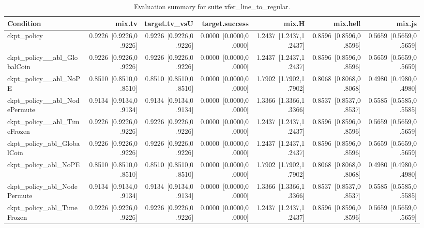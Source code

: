\begin{table}[t]
\centering
\caption{Evaluation summary for suite xfer_line_to_regular.}
\label{tab:eval_xfer_line_to_regular}
\begin{tabular}{lrrrrrr}
\toprule
Condition & mix.tv & target.tv\_vsU & target.success & mix.H & mix.hell & mix.js \\
\midrule
ckpt\_policy & 0.9226~[0.9226,0.9226] & 0.9226~[0.9226,0.9226] & 0.0000~[0.0000,0.0000] & 1.2437~[1.2437,1.2437] & 0.8596~[0.8596,0.8596] & 0.5659~[0.5659,0.5659] \\
ckpt\_policy\_\_abl\_GlobalCoin & 0.9226~[0.9226,0.9226] & 0.9226~[0.9226,0.9226] & 0.0000~[0.0000,0.0000] & 1.2437~[1.2437,1.2437] & 0.8596~[0.8596,0.8596] & 0.5659~[0.5659,0.5659] \\
ckpt\_policy\_\_abl\_NoPE & 0.8510~[0.8510,0.8510] & 0.8510~[0.8510,0.8510] & 0.0000~[0.0000,0.0000] & 1.7902~[1.7902,1.7902] & 0.8068~[0.8068,0.8068] & 0.4980~[0.4980,0.4980] \\
ckpt\_policy\_\_abl\_NodePermute & 0.9134~[0.9134,0.9134] & 0.9134~[0.9134,0.9134] & 0.0000~[0.0000,0.0000] & 1.3366~[1.3366,1.3366] & 0.8537~[0.8537,0.8537] & 0.5585~[0.5585,0.5585] \\
ckpt\_policy\_\_abl\_TimeFrozen & 0.9226~[0.9226,0.9226] & 0.9226~[0.9226,0.9226] & 0.0000~[0.0000,0.0000] & 1.2437~[1.2437,1.2437] & 0.8596~[0.8596,0.8596] & 0.5659~[0.5659,0.5659] \\
ckpt\_policy\_abl\_GlobalCoin & 0.9226~[0.9226,0.9226] & 0.9226~[0.9226,0.9226] & 0.0000~[0.0000,0.0000] & 1.2437~[1.2437,1.2437] & 0.8596~[0.8596,0.8596] & 0.5659~[0.5659,0.5659] \\
ckpt\_policy\_abl\_NoPE & 0.8510~[0.8510,0.8510] & 0.8510~[0.8510,0.8510] & 0.0000~[0.0000,0.0000] & 1.7902~[1.7902,1.7902] & 0.8068~[0.8068,0.8068] & 0.4980~[0.4980,0.4980] \\
ckpt\_policy\_abl\_NodePermute & 0.9134~[0.9134,0.9134] & 0.9134~[0.9134,0.9134] & 0.0000~[0.0000,0.0000] & 1.3366~[1.3366,1.3366] & 0.8537~[0.8537,0.8537] & 0.5585~[0.5585,0.5585] \\
ckpt\_policy\_abl\_TimeFrozen & 0.9226~[0.9226,0.9226] & 0.9226~[0.9226,0.9226] & 0.0000~[0.0000,0.0000] & 1.2437~[1.2437,1.2437] & 0.8596~[0.8596,0.8596] & 0.5659~[0.5659,0.5659] \\
\bottomrule
\end{tabular}
\end{table}
